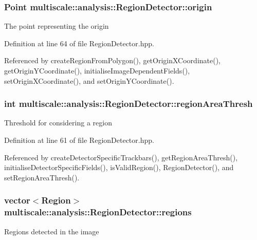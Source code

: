 \hypertarget{classmultiscale_1_1analysis_1_1RegionDetector_a8d2a487b7a4168ba94caa3596efbf794}{
\subsubsection[{origin}]{\setlength{\rightskip}{0pt plus 5cm}Point multiscale\-::analysis\-::\-Region\-Detector\-::origin\hspace{0.3cm}{\ttfamily [private]}}}\label{classmultiscale_1_1analysis_1_1RegionDetector_a8d2a487b7a4168ba94caa3596efbf794}
The point representing the origin 

Definition at line 64 of file Region\-Detector.\-hpp.



Referenced by create\-Region\-From\-Polygon(), get\-Origin\-X\-Coordinate(), get\-Origin\-Y\-Coordinate(), initialise\-Image\-Dependent\-Fields(), set\-Origin\-X\-Coordinate(), and set\-Origin\-Y\-Coordinate().

\hypertarget{classmultiscale_1_1analysis_1_1RegionDetector_a1f637073a3d946d000dceed01412f19a}{
\subsubsection[{region\-Area\-Thresh}]{\setlength{\rightskip}{0pt plus 5cm}int multiscale\-::analysis\-::\-Region\-Detector\-::region\-Area\-Thresh\hspace{0.3cm}{\ttfamily [private]}}}\label{classmultiscale_1_1analysis_1_1RegionDetector_a1f637073a3d946d000dceed01412f19a}
Threshold for considering a region 

Definition at line 61 of file Region\-Detector.\-hpp.



Referenced by create\-Detector\-Specific\-Trackbars(), get\-Region\-Area\-Thresh(), initialise\-Detector\-Specific\-Fields(), is\-Valid\-Region(), Region\-Detector(), and set\-Region\-Area\-Thresh().

\hypertarget{classmultiscale_1_1analysis_1_1RegionDetector_aa6517ceb3a58295448d32e6e41499893}{
\subsubsection[{regions}]{\setlength{\rightskip}{0pt plus 5cm}vector$<${\bf Region}$>$ multiscale\-::analysis\-::\-Region\-Detector\-::regions\hspace{0.3cm}{\ttfamily [private]}}}\label{classmultiscale_1_1analysis_1_1RegionDetector_aa6517ceb3a58295448d32e6e41499893}
Regions detected in the image 

